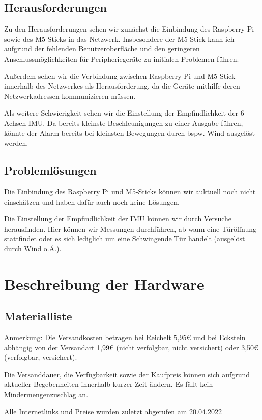 \documentclass[a4paper,12pt]{article}
\begin{document}
\subsection{Herausforderungen}
Zu den Herausforderungen sehen wir zunächst die Einbindung des Raspberry Pi sowie des M5-Sticks in das Netzwerk. Insbesondere der M5 Stick kann ich aufgrund der fehlenden Benutzeroberfläche und den geringeren Anschlussmöglichkeiten für Peripheriegeräte zu initialen Problemen führen.\par
Außerdem sehen wir die Verbindung zwischen Raspberry Pi und M5-Stick innerhalb des Netzwerkes als Herausforderung, da die Geräte mithilfe deren Netzwerkadressen kommunizieren müssen.\par 
Als weitere Schwierigkeit sehen wir die Einstellung der Empfindlichkeit der 6-Achsen-IMU. Da bereits kleinste Beschleunigungen zu einer Ausgabe führen, könnte der Alarm bereits bei kleinsten Bewegungen durch bspw. Wind ausgelöst werden. 

\subsection{Problemlösungen}
Die Einbindung des Raspberry Pi und M5-Sticks können wir auktuell noch nicht einschätzen und haben dafür auch noch keine Lösungen.\par 
Die Einstellung der Empfindlichkeit der IMU können wir durch Versuche herausfinden. Hier können wir Messungen durchführen, ab wann eine Türöffnung stattfindet oder es sich lediglich um eine Schwingende Tür handelt (ausgelöst durch Wind o.Ä.).

\section{Beschreibung der Hardware}
\subsection{Materialliste}
Anmerkung: Die Versandkosten betragen bei Reichelt 5,95€ und bei Eckstein abhängig von der Versandart 1,99€ (nicht verfolgbar, nicht versichert) oder 3,50€ (verfolgbar, versichert).\par Die Versanddauer, die Verfügbarkeit sowie der Kaufpreis können sich aufgrund aktueller Begebenheiten innerhalb kurzer Zeit ändern. Es fällt kein Mindermengenzuschlag an.\par 
Alle Internetlinks und Preise wurden zuletzt abgerufen am 20.04.2022
\end{document}
